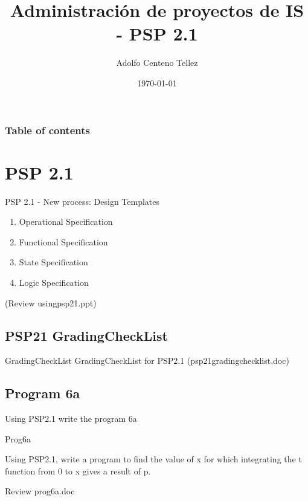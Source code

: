 \documentclass{beamer}
\begin{document}
\title{Administración de proyectos de IS - PSP 2.1}  
\author{Adolfo Centeno Tellez}
\date{\today} 

\begin{frame}
\titlepage
\end{frame}

\begin{frame}\frametitle{Table of contents}\tableofcontents
\end{frame} 


\section{PSP 2.1}

\begin{frame} 

PSP 2.1 - New process: Design Templates


\begin{enumerate}
\item
 Operational Specification
\item
 Functional Specification
\item
 State Specification
\item
 Logic Specification
\end{enumerate} 

(Review usingpsp21.ppt)

\end{frame}


\subsection{PSP21 GradingCheckList}

\begin{frame}


\begin{block}{GradingCheckList}
  GradingCheckList for PSP2.1 (psp21gradingchecklist.doc)
\end{block}


\end{frame}


\subsection{Program 6a}

\begin{frame}

Using PSP2.1 write the program 6a

\begin{block}{Prog6a}

Using PSP2.1, write a program to find the value of x for which 
integrating the t function from 0 to x gives a result of p.

\end{block}

Review prog6a.doc

\end{frame}
\end{document}
